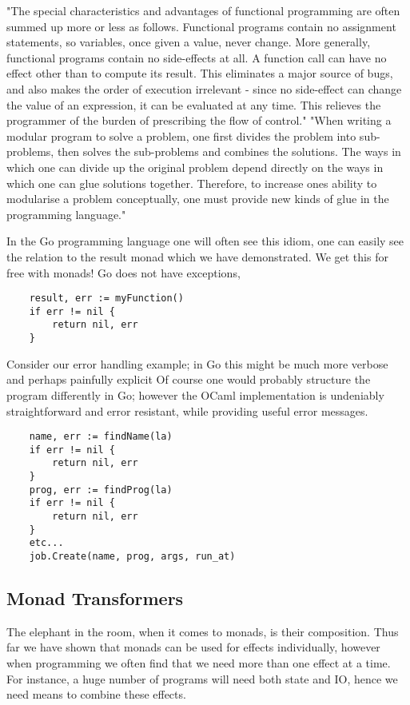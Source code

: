 "The special characteristics and advantages of functional programming are often summed up more or less as follows.
Functional programs contain no assignment statements, so variables,
once given a value, never change.
More generally, functional programs contain no side-effects at all.
A function call can have no effect other than to compute its result.
This eliminates a major source of bugs,
and also makes the order of execution irrelevant - since no side-effect
can change the value of an expression,
it can be evaluated at any time.
This relieves the programmer of the burden of prescribing the flow of control."
"When writing a modular program to solve a problem, one first divides the problem into sub- problems, then solves the sub-problems and combines the solutions. The ways in which one can divide up the original problem depend directly on the ways in which one can glue solutions together. Therefore, to increase ones ability to modularise a problem conceptually, one must provide new kinds of glue in the programming language."
\cite{hughes1989functional}

In the Go programming language one will often see this idiom,
one can easily see the relation to the result monad which we
have demonstrated.
We get this for free with monads!
Go does not have exceptions,

\begin{verbatim}
    result, err := myFunction()
    if err != nil {
        return nil, err
    }
\end{verbatim}

Consider our error handling example;
in Go this might be much more verbose
and perhaps painfully explicit
Of course one would probably structure the program differently in Go;
however the OCaml implementation is undeniably straightforward
and error resistant, while providing useful error messages.

\begin{verbatim}
    name, err := findName(la)
    if err != nil {
        return nil, err
    }
    prog, err := findProg(la)
    if err != nil {
        return nil, err
    }
    etc...
    job.Create(name, prog, args, run_at)
\end{verbatim}

\subsection{Monad Transformers}
The elephant in the room, when it comes to monads, is their composition.
Thus far we have shown that monads can be used for effects individually,
however when programming we often find that we need more than one effect
at a time.
For instance, a huge number of programs will need both state and IO,
hence we need means to combine these effects.

